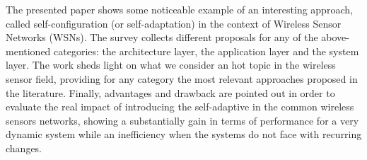 The presented paper shows some noticeable example of an interesting approach, called self-configuration (or self-adaptation) in the context of Wireless Sensor Networks (WSNs). The survey collects different proposals for any of the above-mentioned categories: the architecture layer, the application layer and the system layer.
The work sheds light on what we consider an hot topic in the wireless sensor field, providing for any category the most relevant approaches proposed in the literature.
Finally, advantages and drawback are pointed out in order to evaluate the real impact of introducing the self-adaptive in the common wireless sensors networks, showing a substantially gain in terms of performance for a very dynamic system while an inefficiency when the systems do not face with recurring changes.